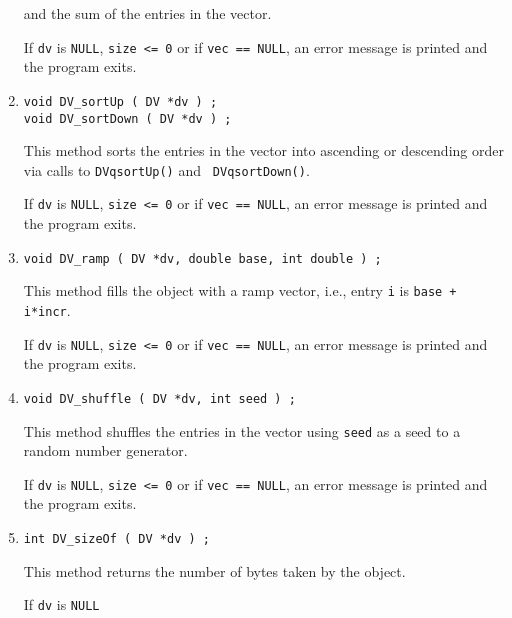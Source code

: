 \begin{enumerate}
and the sum of the entries in the vector.
\par {}
If {\tt dv} is {\tt NULL}, {\tt size <= 0} or if {\tt vec == NULL}, 
an error message is printed and the program exits.
\item
\begin{verbatim}
void DV_sortUp ( DV *dv ) ;
void DV_sortDown ( DV *dv ) ;
\end{verbatim}
This method sorts the entries in the vector into ascending or
descending order via calls to {\tt DVqsortUp()} and {\tt
DVqsortDown()}.
\par {}
If {\tt dv} is {\tt NULL}, {\tt size <= 0} or if {\tt vec == NULL}, 
an error message is printed and the program exits.
\item
\begin{verbatim}
void DV_ramp ( DV *dv, double base, int double ) ;
\end{verbatim}
This method fills the object with a ramp vector,
i.e., entry {\tt i} is {\tt base + i*incr}.
\par {}
If {\tt dv} is {\tt NULL}, {\tt size <= 0} or if {\tt vec == NULL}, 
an error message is printed and the program exits.
\item
\begin{verbatim}
void DV_shuffle ( DV *dv, int seed ) ;
\end{verbatim}
This method shuffles the entries in the vector
using {\tt seed} as a seed to a random number generator.
\par {}
If {\tt dv} is {\tt NULL}, {\tt size <= 0} or if {\tt vec == NULL}, 
an error message is printed and the program exits.
\item
\begin{verbatim}
int DV_sizeOf ( DV *dv ) ;
\end{verbatim}
This method returns the number of bytes taken by the object.
\par {}
If {\tt dv} is {\tt NULL}

\end{enumerate}
